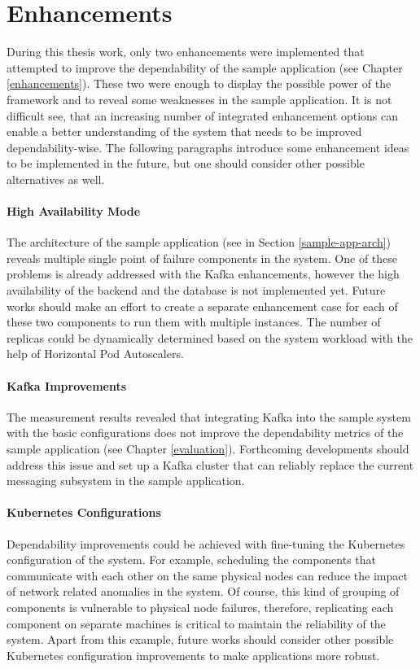 \section{Enhancements}

During this thesis work, only two enhancements were implemented that attempted to improve the dependability of the sample application (see Chapter \ref{enhancements}). These two were enough to display the possible power of the framework and to reveal some weaknesses in the sample application. It is not difficult see, that an increasing number of integrated enhancement options can enable a better understanding of the system that needs to be improved dependability-wise. The following paragraphs introduce some enhancement ideas to be implemented in the future, but one should consider other possible alternatives as well.

\paragraph{High Availability Mode} The architecture of the sample application (see in Section \ref{sample-app-arch}) reveals multiple single point of failure components in the system. One of these problems is already addressed with the Kafka enhancements, however the high availability of the backend and the database is not implemented yet. Future works should make an effort to create a separate enhancement case for each of these two components to run them with multiple instances. The number of replicas could be dynamically determined based on the system workload with the help of Horizontal Pod Autoscalers.

\paragraph{Kafka Improvements} The measurement results revealed that integrating Kafka into the sample system with the basic configurations does not improve the dependability metrics of the sample application (see Chapter \ref{evaluation}). Forthcoming developments should address this issue and set up a Kafka cluster that can reliably replace the current messaging subsystem in the sample application. 

\paragraph{Kubernetes Configurations} Dependability improvements could be achieved with fine-tuning the Kubernetes configuration of the system. For example, scheduling the components that communicate with each other on the same physical nodes can reduce the impact of network related anomalies in the system. Of course, this kind of grouping of components is vulnerable to physical node failures, therefore, replicating each component on separate machines is critical to maintain the reliability of the system. Apart from this example, future works should consider other possible Kubernetes configuration improvements to make applications more robust.

